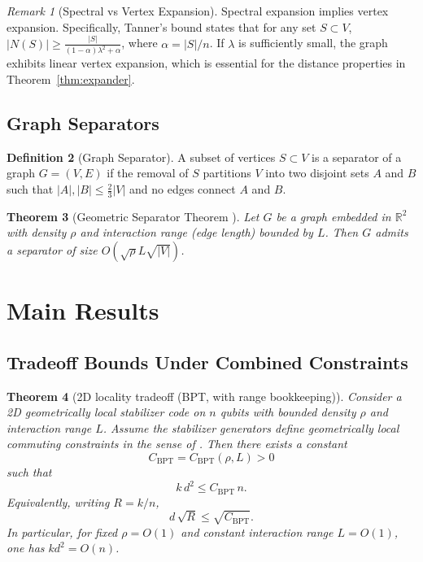 \documentclass[11pt,a4paper]{article}
\newtheorem{theorem}{Theorem}[section]
\theoremstyle{definition}
\newtheorem{definition}[theorem]{Definition}
\theoremstyle{remark}
\newtheorem{remark}[theorem]{Remark}
\begin{document}
\begin{remark}[Spectral vs Vertex Expansion]
Spectral expansion implies vertex expansion. Specifically, Tanner's bound states that for any set $S \subset V$, $|N(S)| \ge \frac{|S|}{(1-\alpha)\lambda^2 + \alpha}$, where $\alpha = |S|/n$. If $\lambda$ is sufficiently small, the graph exhibits linear vertex expansion, which is essential for the distance properties in Theorem~\ref{thm:expander}.
\end{remark}

\subsection{Graph Separators}

\begin{definition}[Graph Separator]
A subset of vertices $S \subset V$ is a separator of a graph $G=(V,E)$ if the removal of $S$ partitions $V$ into two disjoint sets $A$ and $B$ such that $|A|, |B| \le \frac{2}{3}|V|$ and no edges connect $A$ and $B$.
\end{definition}

\begin{theorem}[Geometric Separator Theorem \cite{MillerTengThurstonVavasis}]\label{thm:geometric_separator}
Let $G$ be a graph embedded in $\mathbb{R}^2$ with density $\rho$ and interaction range (edge length) bounded by $L$. Then $G$ admits a separator of size $O(\sqrt{\rho} L \sqrt{|V|})$.
\end{theorem}

\section{Main Results}

\subsection{Tradeoff Bounds Under Combined Constraints}

\begin{theorem}[2D locality tradeoff (BPT, with range bookkeeping)]\label{thm:main}
Consider a 2D geometrically local stabilizer code on $n$ qubits with bounded density $\rho$ and interaction range $L$. Assume the stabilizer generators define geometrically local \emph{commuting constraints} in the sense of \cite{BPT}. Then there exists a constant
\[
C_{\mathrm{BPT}} = C_{\mathrm{BPT}}(\rho,L) > 0
\]
such that
\[
k\, d^2 \le C_{\mathrm{BPT}}\, n.
\]
Equivalently, writing $R=k/n$,
\[
d\,\sqrt{R} \le \sqrt{C_{\mathrm{BPT}}}.
\]
In particular, for fixed $\rho=O(1)$ and constant interaction range $L=O(1)$, one has $k d^2 = O(n)$.
\end{theorem}
\end{document}
